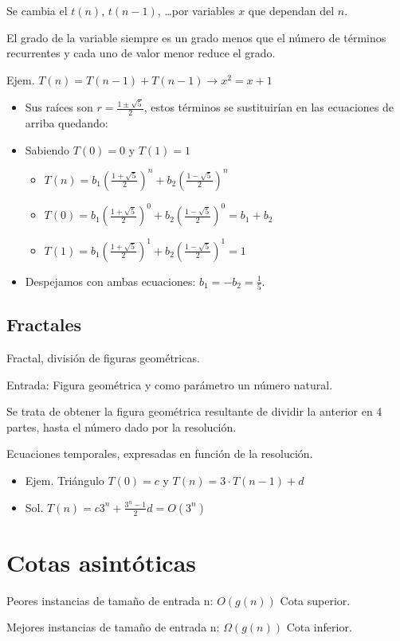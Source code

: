 Se cambia el $t(n)$, $t(n-1)$, \ldots por variables $x$ que dependan del $n$.

El grado de la variable siempre es un grado menos que el número de términos recurrentes y cada uno de valor menor reduce el grado.

Ejem. $T(n)=T(n-1)+T(n-1) \rightarrow x^2= x + 1$
\begin{itemize}
  \item Sus raíces son $r = \frac{1\pm \sqrt{5}}{2}$, estos términos se sustituirían en las ecuaciones de arriba quedando:
  \item Sabiendo $T(0) = 0$ y $T(1)=1$
  \begin{itemize}
    \item $T(n)= b_1(\frac{1+ \sqrt{5}}{2})^n + b_2(\frac{1- \sqrt{5}}{2})^n$
    \item $T(0)= b_1(\frac{1+ \sqrt{5}}{2})^0 + b_2(\frac{1- \sqrt{5}}{2})^0 = b_1 + b_2$
    \item $T(1)= b_1(\frac{1+ \sqrt{5}}{2})^1 + b_2(\frac{1- \sqrt{5}}{2})^1 = 1$
  \end{itemize}
  \item Despejamos con ambas ecuaciones: $b_1 = -b_2 = \frac{1}{5}$.
\end{itemize}

\subsection{Fractales}
Fractal, división de figuras geométricas.

Entrada: Figura geométrica y como parámetro un número natural.

Se trata de obtener la figura geométrica resultante de dividir la anterior en 4 partes, hasta el número dado por la resolución.

Ecuaciones temporales, expresadas en función de la resolución.
\begin{itemize}
  \item Ejem. Triángulo $T(0)=c$ y $T(n)=3\cdot T(n-1)+d$
  \item Sol. $T(n)= c3^n+ \frac{3^n-1}{2}d=O(3^n)$
\end{itemize}

\section{Cotas asintóticas}
Peores instancias de tamaño de entrada n: $O(g(n))$ Cota superior.

Mejores instancias de tamaño de entrada n: $\Omega(g(n))$ Cota inferior.

